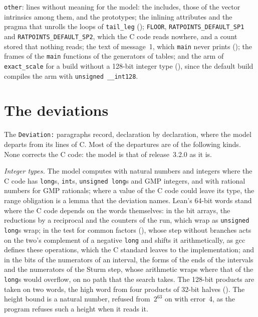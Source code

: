 \verb|other|: lines without meaning for the model: the includes, those of the vector intrinsics
among them, and the prototypes; the inlining attributes and the pragma that unrolls the loops of
\verb|tail_leg| (); \verb|FLOOR|, \verb|RATPOINTS_DEFAULT_SP1| and
\verb|RATPOINTS_DEFAULT_SP2|, which the C code reads nowhere, and a count stored that nothing reads;
the text of message~1, which \verb|main| never prints (); the frames of
the \verb|main| functions of the generators of tables; and the arm of \verb|exact_scale| for a build
without a 128-bit integer type (), since the default build
compiles the arm with \verb|unsigned __int128|.

\section{The deviations}\label{sec:ccodeDeviations}

The \verb|Deviation:| paragraphs record, declaration by declaration, where the model departs from
its lines of C. Most of the departures are of the following kinds. None corrects the C code: the
model is that of release~3.2.0 as it is.

\emph{Integer types.} The model computes with natural numbers and integers where the C code has
\verb|long|s, \verb|int|s, \verb|unsigned long|s and GMP integers, and with rational numbers for GMP
rationals; where a value of the C code could leave its type, the range obligation is a lemma that
the deviation names. Lean's 64-bit words stand where the C code depends on the words themselves: in
the bit arrays, the reductions by a reciprocal and the counters of the run, which wrap as
\verb|unsigned long|s wrap; in the test for common factors (), whose
step without branches acts on the two's complement of a negative \verb|long| and shifts it
arithmetically, as gcc defines these operations, which the C standard leaves to the implementation;
and in the bits of the numerators of an interval, the forms of the ends of the intervals and the
numerators of the Sturm step, whose arithmetic wraps where that of the \verb|long|s would overflow,
on no path that the search takes. The 128-bit products are taken on two words, the high word from
four products of 32-bit halves (). The height bound is a natural
number, refused from~$2^{63}$ on with error~4, as the program refuses such a height when it reads
it.

